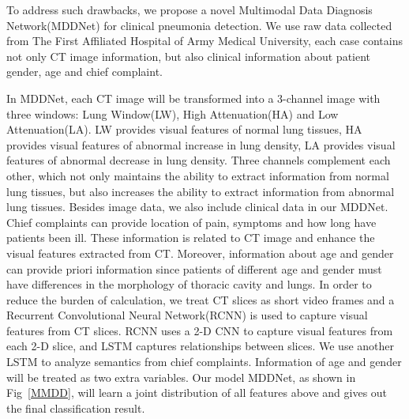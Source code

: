 To address such drawbacks, we propose a novel Multimodal Data Diagnosis Network(MDDNet) for clinical pneumonia detection. We use raw data collected from The First Affiliated Hospital of Army Medical University, each case contains not only CT image information, but also clinical information about patient gender, age and chief complaint. 

In MDDNet, each CT image will be transformed into a 3-channel image with three windows: Lung Window(LW), High Attenuation(HA) and Low Attenuation(LA). LW provides visual features of normal lung tissues, HA provides visual features of abnormal increase in lung density, LA provides visual features of abnormal decrease in lung density. Three channels complement each other, which not only maintains the ability to extract information from normal lung tissues, but also increases the ability to extract information from abnormal lung tissues.
Besides image data, we also include clinical data in our MDDNet. Chief complaints can provide location of pain, symptoms and how long have patients been ill. These information is related to CT image and enhance the visual features extracted from CT. Moreover, information about age and gender can provide priori information since patients of different age and gender must have differences in the morphology of thoracic cavity and lungs. 
In order to reduce the burden of calculation, we treat CT slices as short video frames and a Recurrent Convolutional Neural Network(RCNN) is used to capture visual features from CT slices. RCNN uses a 2-D CNN to capture visual features from each 2-D slice, and LSTM captures relationships between slices. We use another LSTM to analyze semantics from chief complaints. Information of age and gender will be treated as two extra variables. Our model MDDNet, as shown in Fig~\ref{MMDD}, will learn a joint distribution of all features above and gives out the final classification result.

